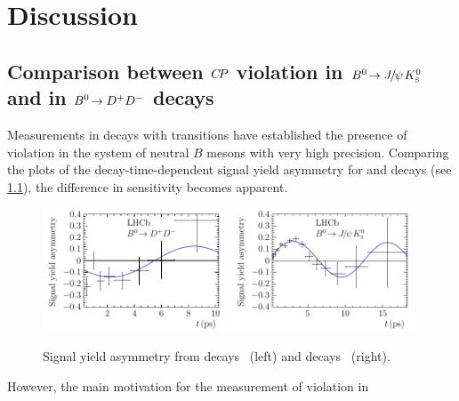 
\chapter{Discussion}
\label{sec:discussion}



\section{Comparison between \texorpdfstring{${C\!P}$}{CP} violation in
\texorpdfstring{\mbox{${{B}^0}\!\rightarrow {\ensuremath{{J\mskip -3mu/\mskip -2mu\psi\mskip 2mu}}}{\ensuremath{{K}^0_{\mathrm{ \scriptscriptstyle S}}}}$}}{Bd2JPsiKS} and in
\texorpdfstring{\mbox{${{B}^0}\!\rightarrow {\ensuremath{{D}^+}}{\ensuremath{{D}^-}}$}}{Bd2DD} decays}
\label{sec:discussion:JpsiKS_DD_comparison}

Measurements in decays with \bToccbars transitions have established the
presence of \CP violation in the system of neutral $B$ mesons with very high
precision. Comparing the plots of the decay-time-dependent signal yield
asymmetry for \BdToJPsiKS and \BdToDD decays (see
\cref{fig:discussion:asymmetry}), the difference in sensitivity becomes
apparent.
\begin{figure}[hbt]
\centering
\includegraphics[width=0.49\textwidth]{08-Discussion/tikz/pdf/Asymmetry_B2DD.pdf}
\includegraphics[width=0.49\textwidth]{08-Discussion/tikz/pdf/Asymmetry_B2JPsiKS.pdf}
\caption{Signal yield asymmetry from \BdToDD decays~\cite{LHCb-PAPER-2016-037} (left)
and \BdToJPsiKS decays~\cite{LHCb-PAPER-2015-004} (right).}
\label{fig:discussion:asymmetry}
\end{figure}
However, the main motivation for the measurement of \CP violation in \BdToDD
